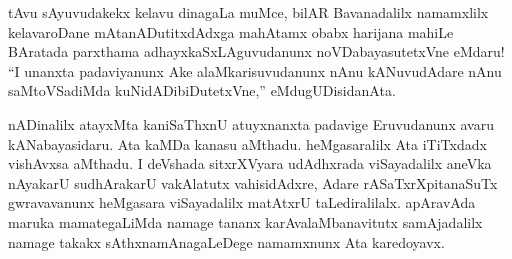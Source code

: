 tAvu sAyuvudakekx kelavu dinagaLa muMce, bilAR Bavanadalilx namamxlilx kelava\-roDane mAtanADutitxdAdxga mahAtamx obabx harijana mahiLe BAratada parxthama adhayxkaSx\-LAguvudanunx noVDabayasutetxVne eMdaru! ``I unanxta padaviyanunx Ake alaMkarisuvudanunx nAnu kANuvudAdare nAnu saMtoVSadiMda kuNidADibiDutetxVne,'' eMdu\-gUDisidanAta.

nADinalilx atayxMta kaniSaThxnU atuyxnanxta padavige Eruvudanunx avaru kANabayasi\-daru. Ata kaMDa kanasu aMthadu. heMgasaralilx Ata iTiTxdadx vishAvxsa aMthadu. I deVshada sitxrXVyara udAdhxrada viSayadalilx aneVka nAyakarU sudhArakarU vakAlatutx vahisidAdxre, Adare rASaTxrXpitanaSuTx gwravavanunx heMgasara viSayadalilx matAtxrU taLediralilalx. apAravAda maruka mamategaLiMda namage tananx karAvalaMbanavitutx samAjadalilx namage takakx sAthxnamAnagaLeDege namamxnunx Ata karedoyavx.


